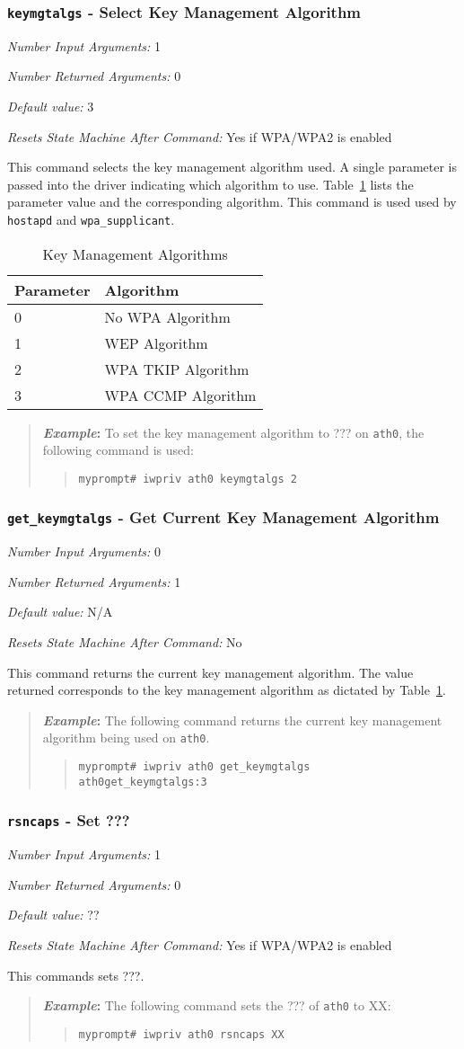 \documentclass[10pt,fullpage]{article}
\newcommand{\mytt}[1]{{\texttt{#1}}}
\newcommand{\bv}{\begin{verse}}
\newcommand{\ev}{\end{verse}}
\newcommand{\cmd}[1]{{\texttt{myprompt\# #1}}}
\newcommand{\argdesc}[4]{\begin{description}
\itemsep -6pt
\item \textit{Number Input Arguments:} #1
\item \textit{Number Returned Arguments:} #2
\item \textit{Default value:} #3
\item \textit{Resets State Machine After Command:} #4
\end{description}
}
\newenvironment{example}{\begin{quote}\textbf{\textit{Example}:}}{\end{quote}}
\begin{document}
\subsubsection{\mytt{keymgtalgs} - Select Key Management Algorithm}
\argdesc{1}{0}{3}{Yes if WPA/WPA2 is enabled}
This command selects the key management algorithm used.  A single
parameter is passed into the driver indicating which algorithm to use.
Table~\ref{tab:keymgtalgs} lists the parameter value and the
corresponding algorithm.  This command is used used by \mytt{hostapd}
and \mytt{wpa\_supplicant}.
\begin{table}
  \centering
  \begin{tabular}{|l|l|} \hline
    Parameter & Algorithm \\ \hline
    0 & No WPA Algorithm\\
    1 & WEP Algorithm \\
    2 & WPA TKIP Algorithm \\
    3 & WPA CCMP Algorithm \\ \hline
  \end{tabular}
  \caption{Key Management Algorithms}
  \label{tab:keymgtalgs}
\end{table}
\begin{example}
  To set the key management algorithm to ??? on \mytt{ath0}, the
  following command is used:
  \bv
  \cmd{iwpriv ath0 keymgtalgs 2}
  \ev
\end{example}

\subsubsection{\mytt{get\_keymgtalgs} - Get Current Key Management Algorithm}
\argdesc{0}{1}{N/A}{No}
This command returns the current key management algorithm.  The value
returned corresponds to the key management algorithm as dictated by
Table~\ref{tab:keymgtalgs}.
\begin{example}
  The following command returns the current key management algorithm
  being used on \mytt{ath0}.
  \bv
  \cmd{iwpriv ath0 get\_keymgtalgs}\\
  \mytt{ath0\hspace{32pt}get\_keymgtalgs:3}
  \ev
\end{example}

\subsubsection{\mytt{rsncaps} - Set ???}
\argdesc{1}{0}{??}{Yes if WPA/WPA2 is enabled}
This commands sets ???.
\begin{example}
  The following command sets the ??? of \mytt{ath0} to XX:
  \bv
  \cmd{iwpriv ath0 rsncaps XX}
  \ev
\end{example}
\end{document}
